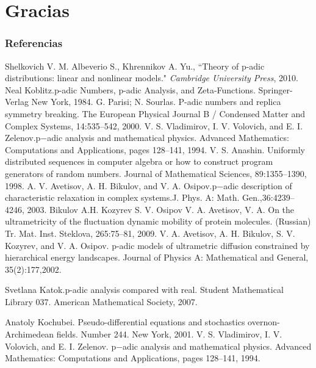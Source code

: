 \documentclass{beamer}
\theoremstyle{definition}
\numberwithin{equation}{section}
\begin{document}
\section*{Gracias \blacksmiley{}}


\begin{frame}[allowframebreaks]
	\frametitle{Referencias} 
	\begin{thebibliography}{100} %
		 Shelkovich V. M. Albeverio S., Khrennikov A. Yu., ``Theory of p-adic distributions: linear and nonlinear models." \emph{Cambridge University Press}, 2010.
		 Neal Koblitz.p-adic Numbers, p-adic Analysis, and Zeta-Functions. Springer-Verlag New York, 1984.
		 G. Parisi; N. Sourlas. P-adic numbers and replica symmetry breaking. The European Physical Journal B / Condensed Matter and Complex Systems, 14:535–542, 2000.
		  V. S. Vladimirov, I. V. Volovich, and E. I. Zelenov.p−adic analysis and mathematical physics. Advanced Mathematics: Computations and Applications, pages 128–141, 1994.
		 V. S. Anashin. Uniformly distributed sequences in computer algebra or how to construct program generators of random numbers. Journal of Mathematical Sciences, 89:1355–1390, 1998.
		 A. V. Avetisov, A. H. Bikulov, and V. A. Osipov.p−adic description of characteristic relaxation in complex systems.J. Phys. A: Math. Gen.,36:4239–4246, 2003.
		 Bikulov A.H. Kozyrev S. V. Osipov V. A. Avetisov, V. A. On the ultrametricity of the fluctuation dynamic mobility of protein molecules. (Russian) Tr. Mat. Inst. Steklova, 265:75–81, 2009.
		 V. A. Avetisov, A. H. Bikulov, S. V. Kozyrev, and V. A. Osipov. p-adic models of ultrametric diffusion constrained by hierarchical energy landscapes. Journal of Physics A: Mathematical and General, 35(2):177,2002.
		
		 Svetlana Katok.p-adic analysis compared with real. Student Mathematical Library 037. American Mathematical Society, 2007.
		
		 Anatoly Kochubei. Pseudo-differential equations and stochastics overnon-Archimedean fields. Number 244. New York, 2001.
		 V. S. Vladimirov, I. V. Volovich, and E. I. Zelenov. p−adic analysis and mathematical physics. Advanced Mathematics: Computations and Applications, pages 128–141, 1994.
	\end{thebibliography}
\end{frame}
\end{document}
